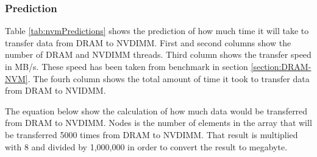 \documentclass[12pt,a4paper,USenglish]{article}      %
\begin{document}
\pagebreak
\subsubsection{Prediction}
Table \ref{tab:nvmPredictions} shows the prediction of how much time it will take to transfer data from DRAM to NVDIMM. First and second columns show the number of DRAM and NVDIMM threads. Third column shows the transfer speed in MB/s. These speed has been taken from benchmark in section \ref{section:DRAM-NVM}. The fourh column shows the total amount of time it took to transfer data from DRAM to NVIDMM.

The equation below show the calculation of how much data would be transferred from DRAM to NVDIMM. Nodes is the number of elements in the array that will be transferred 5000 times from DRAM to NVDIMM. That result is multiplied with 8 and divided by 1,000,000 in order to convert  the result to megabyte.
\end{document}
